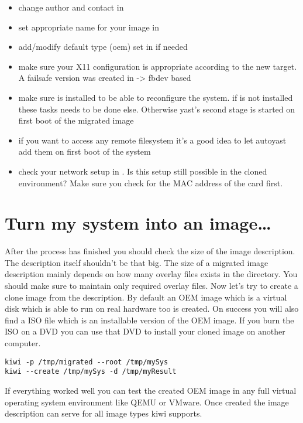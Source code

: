 \begin{itemize}
\item change author and contact in 
\item set appropriate name for your image in 
\item add/modify default type (oem) set in  if needed
\item make sure your X11 configuration is appropriate according to
      the new target. A failsafe version was created in
       -> fbdev based
\item make sure  is installed to be able to reconfigure
      the system. if  is not installed these tasks needs to
      be done else. Otherwise yast's second stage is started on first
      boot of the migrated image
\item if you want to access any remote filesystem it's a good
      idea to let autoyast add them on first boot of the system
\item check your network setup in . Is this
      setup still possible in the cloned environment? Make sure you
      check for the MAC address of the card first.
\end{itemize}

\section{Turn my system into an image\ldots}
After the process has finished you should check the size of the
image description. The description itself shouldn't be that big.
The size of a migrated image description mainly depends on how many
overlay files exists in the  directory. You should make
sure to maintain only required overlay files. Now let's try to create a
clone image from the description. By default an OEM image which is
a virtual disk which is able to run on real hardware too is created.
On success you will also find a ISO file which is an installable
version of the OEM image. If you burn the ISO on a DVD you can use
that DVD to install your cloned image on another computer.

\begin{Command}{14cm}
\begin{verbatim}
kiwi -p /tmp/migrated --root /tmp/mySys
kiwi --create /tmp/mySys -d /tmp/myResult
\end{verbatim}
\end{Command}

If everything worked well you can test the created OEM
image in any full virtual operating system environment like QEMU or
VMware. Once created the image description can serve for all image
types kiwi supports.
 
